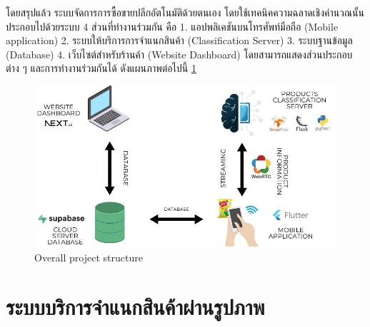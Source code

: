 โดยสรุปแล้ว ระบบจัดการการซื้อขายปลีกอัตโนมัติด้วยตนเอง โดยใช้เทคนิคความฉลาดเชิงคำนวณนั้นประกอบไปด้วยระบบ 4 ส่วนที่ทำงานร่วมกัน คือ 1. แอปพลิเคชันบนโทรศัพท์มือถือ (Mobile application)  2. ระบบให้บริการการจำแนกสินค้า (Classification Server) 3. ระบบฐานข้อมูล (Database) 4. เว็บไซต์สำหรับร้านค้า (Website Dashboard) โดยสามารถแสดงส่วนประกอบต่าง ๆ และการทำงานร่วมกันได้ ดังแผนภาพต่อไปนี้ \ref{fig:Overall project structure}



\begin{figure}[h]
  \begin{center}

    \vspace{0.5cm}\includegraphics[scale=0.5]{pic/diagram/system_diagram.jpg}
  \end{center}

  \caption[Overall project structure]{Overall project structure}
  \label{fig:Overall project structure}
\end{figure}


\section{ระบบบริการจำแนกสินค้าผ่านรูปภาพ}
